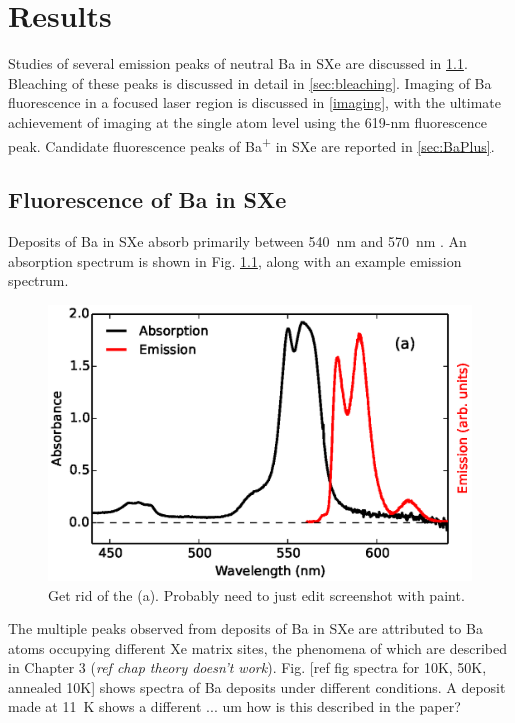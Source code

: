 \chapter{Results}

Studies of several emission peaks of neutral Ba in SXe are discussed in \ref{sec:fluorescence}.  Bleaching of these peaks is discussed in detail in \ref{sec:bleaching}.  Imaging of Ba fluorescence in a focused laser region is discussed in \ref{imaging}, with the ultimate achievement of imaging at the single atom level using the 619-nm fluorescence peak.  Candidate fluorescence peaks of Ba\textsuperscript{+} in SXe are reported in \ref{sec:BaPlus}.

\section{Fluorescence of Ba in SXe}
\label{sec:fluorescence}

Deposits of Ba in SXe absorb primarily between 540~nm and 570~nm \cite{Mong2015,Brian,Shon}.  An absorption spectrum is shown in Fig. \ref{fig:BaAbs}, along with an example emission spectrum.

\begin{figure} %
        \centering
                \includegraphics[width=.7\textwidth]{figures/BaAbs_fromBaSpec.eps}
                \caption{\color{red}Get rid of the (a).  Probably need to just edit screenshot with paint.  \cite{Mong2015}}
\label{fig:BaAbs}
\end{figure}

The multiple peaks observed from deposits of Ba in SXe are attributed to Ba atoms occupying different Xe matrix sites, the phenomena of which are described in Chapter 3 {\color{red}(\emph{ref chap theory doesn't work})}.  Fig. [ref fig spectra for 10K, 50K, annealed 10K] shows spectra of Ba deposits under different conditions.  A deposit made at 11~K shows a different ... um how is this described in the paper?

